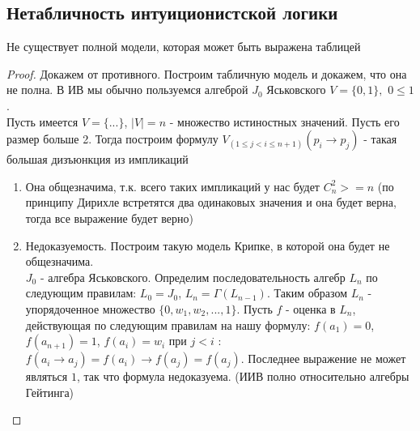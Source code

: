 \subsection{Нетабличность интуиционистской логики}
\label{sec-6-5}
\begin{theorem}
Не существует полной модели, которая может быть выражена таблицей 
\end{theorem}
\begin{proof}
Докажем от противного. Построим табличную модель и докажем, что она не полна. В ИВ мы обычно пользуемся алгеброй $J_{0}$ Яськовского $V = \lbrace 0, 1 \rbrace,$ $0 \leq 1$.\\
Пусть имеется $V = \lbrace ... \rbrace$, $\vert V \vert = n$ - множество истиностных значений. Пусть его размер больше 2.
Тогда построим формулу $V_{(1 \leq j < i \leq n + 1)}(p_{i} \rightarrow p_{j})$ - такая большая дизъюнкция из импликаций
\begin{enumerate}
\item Она общезначима, т.к. всего таких импликаций у нас будет $C_{n}^{2} >= n$ (по принципу Дирихле встретятся два одинаковых значения и она будет верна, тогда все выражение будет верно)
\item Недоказуемость. Построим такую модель Крипке, в которой она будет не общезначима.\\
$J_{0}$ - алгебра Яськовского. Определим последовательность алгебр $L_{n}$ по следующим правилам: $L_{0} = J_{0}$, $L_{n} = \Gamma(L_{n - 1})$. Таким образом $L_{n}$ - упорядоченное множество $\lbrace 0, w_{1}, w_{2}, ..., 1 \rbrace$. Пусть $f$ - оценка в $L_{n}$, действующая по следующим правилам на нашу формулу: $f(a_{1}) = 0$, $f(a_{n+1}) = 1$, $f(a_{i}) = w_{i}$ при $j < i$ $:$ $f(a_{i} \rightarrow a_{j}) = f(a_{i}) \rightarrow f(a_{j}) = f(a_{j})$. Последнее выражение не может являться $1$, так что формула недоказуема. (ИИВ полно относительно алгебры Гейтинга)
\end{enumerate}
\end{proof}
